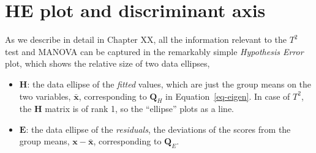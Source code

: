 \documentclass[
  letterpaper,
  10pt,
  krantz2]{krantz}
\makeatletter
\newenvironment{Shaded}{\begin{snugshade}}{\end{snugshade}}
\newcommand{\CommentTok}[1]{\textcolor[rgb]{0.37,0.37,0.37}{#1}}
\newcommand{\DecValTok}[1]{\textcolor[rgb]{0.68,0.00,0.00}{#1}}
\newcommand{\FunctionTok}[1]{\textcolor[rgb]{0.28,0.35,0.67}{#1}}
\newcommand{\NormalTok}[1]{\textcolor[rgb]{0.00,0.23,0.31}{#1}}
\newcommand{\OtherTok}[1]{\textcolor[rgb]{0.00,0.23,0.31}{#1}}
\newcommand{\SpecialCharTok}[1]{\textcolor[rgb]{0.37,0.37,0.37}{#1}}
\providecommand{\tightlist}{%
  \setlength{\itemsep}{0pt}\setlength{\parskip}{0pt}}\usepackage{longtable,booktabs,array}
\newenvironment{kframe}{%
  \medskip{}
  \setlength{\fboxsep}{.8em}
  \def\at@end@of@kframe{}%
  \ifinner\ifhmode%
  \def\at@end@of@kframe{\end{minipage}}%
  \begin{minipage}{\columnwidth}%
  \fi\fi%
  \def\FrameCommand##1{\hskip\@totalleftmargin \hskip-\fboxsep
  \colorbox{shadecolor}{##1}\hskip-\fboxsep
      \hskip-\linewidth \hskip-\@totalleftmargin \hskip\columnwidth}%
  \MakeFramed {\advance\hsize-\width
    \@totalleftmargin\z@ \linewidth\hsize
    \@setminipage}}%
{\par\unskip\endMakeFramed%
  \at@end@of@kframe}
\renewenvironment{Shaded}{\begin{kframe}}{\end{kframe}}
\makeatother
\begin{document}
\hypertarget{he-plot-and-discriminant-axis}{%
\section{HE plot and discriminant
axis}\label{he-plot-and-discriminant-axis}}

As we describe in detail in Chapter XX, all the information relevant to
the \(T^2\) test and MANOVA can be captured in the remarkably simple
\emph{Hypothesis Error} plot, which shows the relative size of two data
ellipses,

\begin{itemize}
\tightlist
\item
  \(\mathbf{H}\): the data ellipse of the \emph{fitted} values, which
  are just the group means on the two variables, \(\bar{\mathbf{x}}\),
  corresponding to \(\mathbf{Q}_H\) in Equation~\ref{eq-eigen}. In case
  of \(T^2\), the \(\mathbf{H}\) matrix is of rank 1, so the ``ellipse''
  plots as a line.
\end{itemize}

\begin{Shaded}
\end{Shaded}

\begin{itemize}
\tightlist
\item
  \(\mathbf{E}\): the data ellipse of the \emph{residuals}, the
  deviations of the scores from the group means,
  \(\mathbf{x} - \bar{\mathbf{x}}\), corresponding to \(\mathbf{Q}_E\).
\end{itemize}
\end{document}
